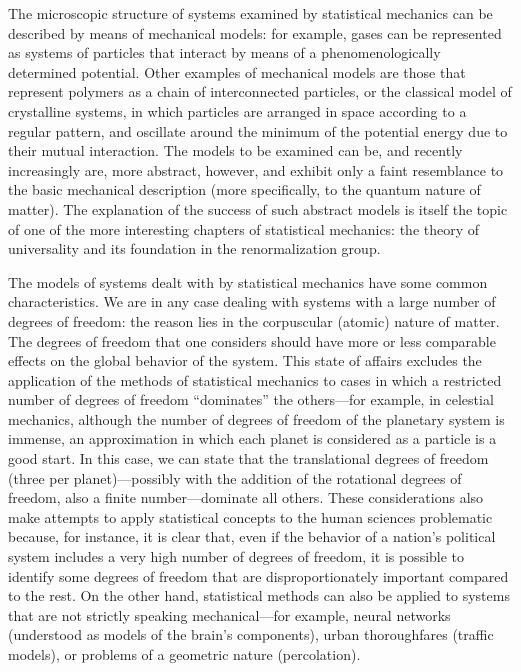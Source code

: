 \documentclass[11pt, a4paper, twoside, openright]{book}
\begin{document}
The microscopic structure of systems examined by statistical mechanics can be described by means of mechanical models: for example, gases can be represented as systems of particles that interact by means of a phenomenologically determined potential. Other examples of mechanical models are those that represent polymers as a chain of interconnected particles, or the classical model of crystalline systems, in which particles are arranged in space according to a regular pattern, and oscillate around the minimum of the potential energy due to their mutual interaction. The models to be examined can be, and recently increasingly are, more abstract, however, and exhibit only a faint resemblance to the basic mechanical description (more specifically, to the quantum nature of matter). The explanation of the success of such abstract models is itself the topic of one of the more interesting chapters of statistical mechanics: the theory of universality and its foundation in the renormalization group.

The models of systems dealt with by statistical mechanics have some common characteristics. We are in any case dealing with systems with a large number of degrees of freedom:  the reason lies in the corpuscular (atomic) nature of matter.
 The degrees of freedom that one considers should have more or less comparable effects on the global behavior of the system.  This state of affairs excludes the application of the methods of statistical mechanics to cases in which a restricted number of degrees of freedom “dominates” the others—for example, in celestial mechanics, although the number of degrees of freedom of the planetary system is immense, an approximation in which each planet is considered as a particle is a good start. In this case, we can state that the translational degrees of freedom (three per planet)—possibly with the addition of the rotational degrees of freedom, also a finite number—dominate all others.
 These considerations also make attempts to apply statistical concepts to the human sciences problematic because, for instance, it is clear that, even if the behavior of a nation’s political system includes a very high number of degrees of freedom, it is possible to identify some degrees of freedom that are disproportionately important compared to the rest.
  On the other hand, statistical methods can also be applied to systems that are not strictly speaking mechanical—for example, neural networks (understood as models of the brain’s components), urban thoroughfares (traffic models), or problems of a geometric nature (percolation).
 
\end{document}
